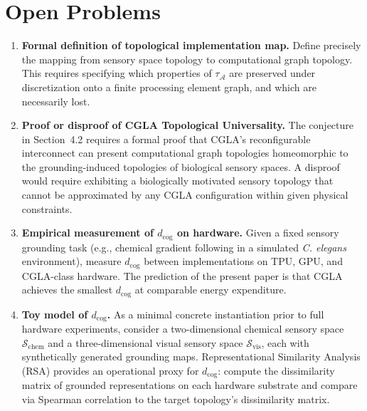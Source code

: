 \documentclass[12pt]{article}
\begin{document}
\section{Open Problems}

\begin{enumerate}[label=\textbf{OP\arabic*.}, leftmargin=*, itemsep=6pt]

\item \textbf{Formal definition of topological implementation map.}
    Define precisely the mapping from sensory space topology to
    computational graph topology. This requires specifying which
    properties of $\tau_{\mathcal{A}}$ are preserved under
    discretization onto a finite processing element graph, and which
    are necessarily lost.

\item \textbf{Proof or disproof of CGLA Topological Universality.}
    The conjecture in Section~4.2 requires a formal proof that
    CGLA's reconfigurable interconnect can present computational graph
    topologies homeomorphic to the grounding-induced topologies of
    biological sensory spaces. A disproof would require exhibiting a
    biologically motivated sensory topology that cannot be approximated
    by any CGLA configuration within given physical constraints.

\item \textbf{Empirical measurement of $d_{\mathrm{cog}}$ on hardware.}
    Given a fixed sensory grounding task (e.g., chemical gradient
    following in a simulated \textit{C. elegans} environment), measure
    $d_{\mathrm{cog}}$ between implementations on TPU, GPU, and
    CGLA-class hardware. The prediction of the present paper is that
    CGLA achieves the smallest $d_{\mathrm{cog}}$ at comparable
    energy expenditure.

\item \textbf{Toy model of $d_{\mathrm{cog}}$.}
    As a minimal concrete instantiation prior to full hardware
    experiments, consider a two-dimensional chemical sensory space
    $\mathcal{S}_{\mathrm{chem}}$ and a three-dimensional visual sensory
    space $\mathcal{S}_{\mathrm{vis}}$, each with synthetically generated
    grounding maps. Representational Similarity Analysis (RSA)
    \cite{kriegeskorte2008} provides an operational proxy for
    $d_{\mathrm{cog}}$: compute the dissimilarity matrix of grounded
    representations on each hardware substrate and compare via Spearman
    correlation to the target topology's dissimilarity matrix.


\end{enumerate}
\end{document}
